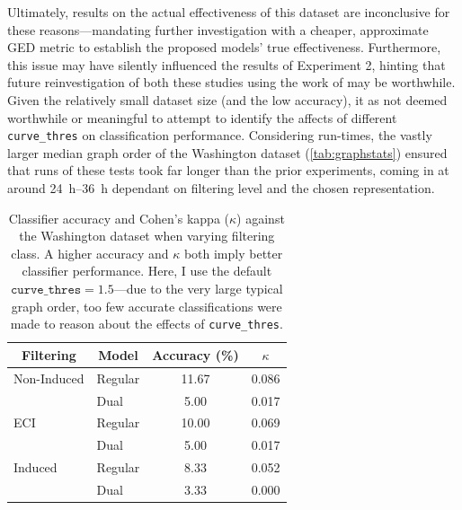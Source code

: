 \documentclass{mpaper}
\begin{document}
Ultimately, results on the actual effectiveness of this dataset are inconclusive for these reasons---mandating further investigation with a cheaper, approximate GED metric to establish the proposed models' true effectiveness.
Furthermore, this issue may have silently influenced the results of Experiment 2, hinting that future reinvestigation of both these studies using the work of \citeauthor{GED-Approx} \cite{GED-Approx} may be worthwhile.
Given the relatively small dataset size (and the low accuracy), it as not deemed worthwhile or meaningful to attempt to identify the affects of different \texttt{curve\_thres} on classification performance.
Considering run-times, the vastly larger median graph order of the Washington dataset (\cref{tab:graphstats}) ensured that runs of these tests took far longer than the prior experiments, coming in at around \SIrange{24}{36}{\hour} dependant on filtering level and the chosen representation.

\begin{table}
	\centering

	\begin{tabular}{llcc}
		\toprule
		\multicolumn{1}{c}{Filtering} & \multicolumn{1}{c}{Model} & Accuracy (\si{\percent}) & $\kappa$ \\
		\midrule
		
		Non-Induced & Regular & 11.67 & 0.086 \\
		& Dual & 5.00 & 0.017 \\
		
		ECI & Regular & 10.00 & 0.069 \\
		& Dual & 5.00 & 0.017 \\
		
		Induced & Regular & 8.33 & 0.052 \\
		& Dual & 3.33 & 0.000 \\
		
		\bottomrule
	\end{tabular}
	
	\vspace{0.5em}
	\caption{
		Classifier accuracy and Cohen's kappa ($\kappa$) against the Washington dataset when varying filtering class.
		A higher accuracy and $\kappa$ both imply better classifier performance.
		Here, I use the default $\mathtt{curve\_thres}=1.5$---due to the very large typical graph order, too few accurate classifications were made to reason about the effects of \texttt{curve\_thres}.
		\label{tab:exp3}
	}
\end{table}
\end{document}
